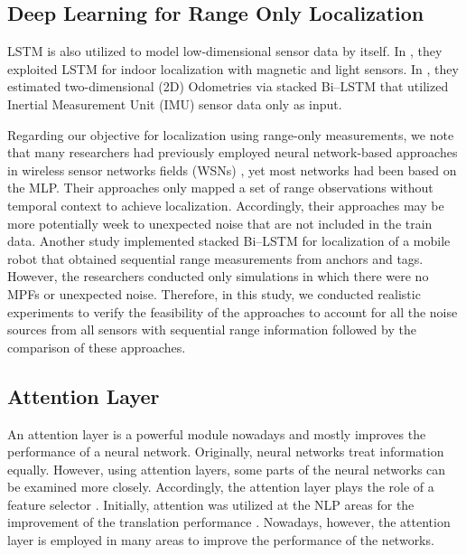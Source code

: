 \documentclass[letterpaper, 10 pt, conference]{ieeeconf}
\begin{document}
 
\subsection{Deep Learning for Range Only Localization}

LSTM is also utilized to model low-dimensional sensor data by itself. In \cite{wang2018deepml}, they exploited LSTM for indoor localization with magnetic and light sensors. In \cite{chen2018ionet}, they estimated two-dimensional (2D) Odometries via stacked Bi--LSTM that utilized Inertial Measurement Unit (IMU) sensor data only as input. 

Regarding our objective for localization using range-only measurements, we note that many researchers had previously employed neural network-based approaches in wireless sensor networks fields (WSNs) \cite{rahman2009localization, abdelhadi2013efficient, kumar2016localization}, yet most networks had been based on the MLP. Their approaches only mapped a set of range observations without temporal context to achieve localization. Accordingly, their approaches may be more potentially week to unexpected noise that are not included in the train data. Another study \cite{lim2018effective} implemented stacked Bi--LSTM for localization of a mobile robot that obtained sequential range measurements from anchors and tags. However, the researchers conducted only simulations in which there were no MPFs or unexpected noise. Therefore, in this study, we conducted realistic experiments to verify the feasibility of the approaches to account for all the noise sources from all sensors with sequential range information followed by the comparison of these approaches.

\subsection{Attention Layer}

An attention layer is a powerful module nowadays and mostly improves the performance of a neural network. Originally, neural networks treat information equally. However, using attention layers, some parts of the neural networks can be examined more closely. Accordingly, the attention layer plays the role of a feature selector \cite{wang2017residual}. Initially, attention was utilized at the NLP areas for the improvement of the translation performance \cite{luong2015effective}. Nowadays, however, the attention layer is employed in many areas to improve the performance of the networks. 
\end{document}
